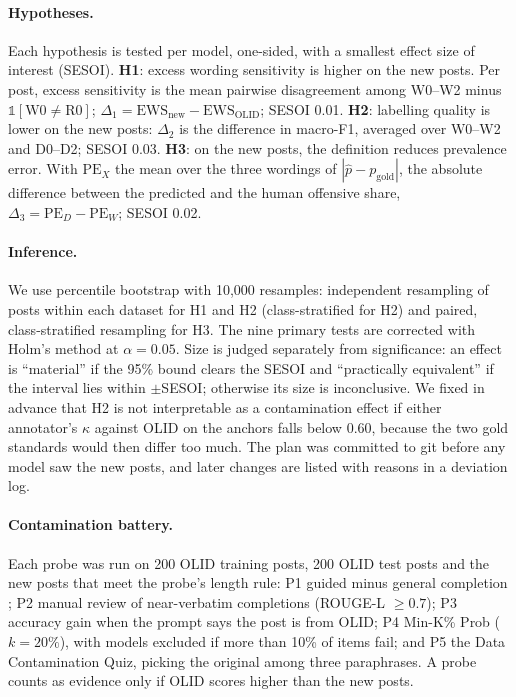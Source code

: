 \documentclass[11pt]{article}
\begin{document}
\paragraph{Hypotheses.} Each hypothesis is tested per model, one-sided, with a smallest effect size of interest (SESOI).
\textbf{H1}: excess wording sensitivity is higher on the new posts. Per post, excess sensitivity is the mean pairwise disagreement among W0--W2 minus $\mathbb{1}[\mathrm{W0} \neq \mathrm{R0}]$; $\Delta_1 = \mathrm{EWS}_{\text{new}} - \mathrm{EWS}_{\text{OLID}}$; SESOI 0.01.
\textbf{H2}: labelling quality is lower on the new posts: $\Delta_2$ is the difference in macro-F1, averaged over W0--W2 and D0--D2; SESOI 0.03.
\textbf{H3}: on the new posts, the definition reduces prevalence error. With $\mathrm{PE}_X$ the mean over the three wordings of $|\hat{p} - p_{\text{gold}}|$, the absolute difference between the predicted and the human offensive share, $\Delta_3 = \mathrm{PE}_D - \mathrm{PE}_W$; SESOI 0.02.

\paragraph{Inference.} We use percentile bootstrap with 10,000 resamples: independent resampling of posts within each dataset for H1 and H2 (class-stratified for H2) and paired, class-stratified resampling for H3. The nine primary tests are corrected with Holm's method \citep{holm1979simple} at $\alpha = 0.05$. Size is judged separately from significance: an effect is ``material'' if the 95\% bound clears the SESOI and ``practically equivalent'' if the interval lies within $\pm$SESOI; otherwise its size is inconclusive. We fixed in advance that H2 is not interpretable as a contamination effect if either annotator's $\kappa$ against OLID on the anchors falls below 0.60, because the two gold standards would then differ too much. The plan was committed to git before any model saw the new posts, and later changes are listed with reasons in a deviation log.

\paragraph{Contamination battery.} Each probe was run on 200 OLID training posts, 200 OLID test posts and the new posts that meet the probe's length rule: P1 guided minus general completion \citep[ROUGE-L;][]{golchin2024time}; P2 manual review of near-verbatim completions (ROUGE-L $\geq 0.7$); P3 accuracy gain when the prompt says the post is from OLID; P4 Min-K\% Prob ($k = 20\%$), with models excluded if more than 10\% of items fail; and P5 the Data Contamination Quiz, picking the original among three paraphrases. A probe counts as evidence only if OLID scores higher than the new posts.
\end{document}
